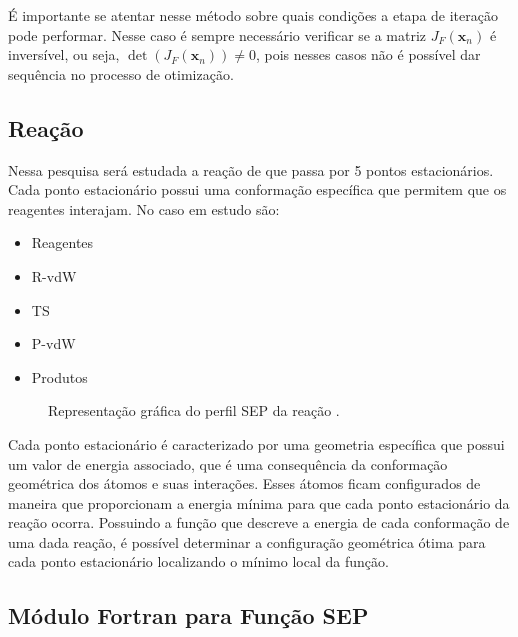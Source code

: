 É importante se atentar nesse método sobre quais condições a etapa de iteração pode performar. Nesse caso é sempre necessário verificar se a matriz $J_F(\mathbf{x}_n)$ é inversível, ou seja, $\det(J_F(\mathbf{x}_n)) \neq 0$, pois nesses casos não é possível dar sequência no processo de otimização.

\subsection{Reação }

Nessa pesquisa será estudada a reação de  que passa por 5 pontos estacionários. Cada ponto estacionário possui uma conformação específica que permitem que os reagentes interajam. No caso em estudo são:
%
\begin{itemize}[itemsep=0pt,parsep=0pt]
  \item Reagentes
  \item R-vdW
  \item TS
  \item P-vdW
  \item Produtos
\end{itemize}

\begin{figure}
  \begin{center}
    
  \end{center}
  \caption{Representação gráfica do perfil SEP da reação .}
  \label{fig:perfil_sep_fh2o}
\end{figure}

Cada ponto estacionário é caracterizado por uma geometria específica que possui um valor de energia associado, que é uma consequência da conformação geométrica dos átomos e suas interações. Esses átomos ficam configurados de maneira que proporcionam a energia mínima para que cada ponto estacionário da reação ocorra. Possuindo a função que descreve a energia de cada conformação de uma dada reação, é possível determinar a configuração geométrica ótima para cada ponto estacionário localizando o mínimo local da função.

\subsection{Módulo Fortran para Função SEP}
\label{sec:module_pes}

